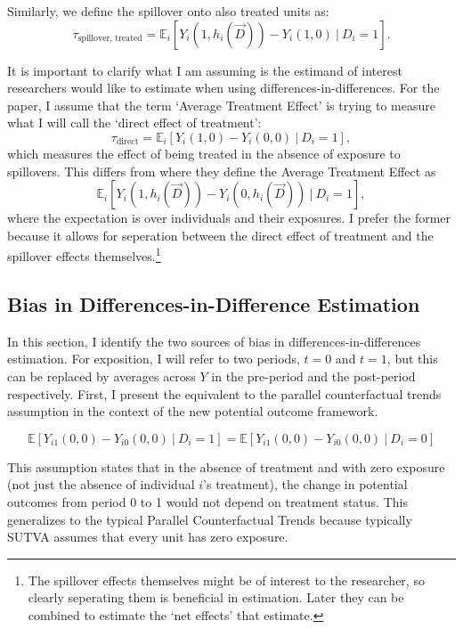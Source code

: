 \documentclass[11pt]{article}
\begin{document}
Similarly, we define the spillover onto also treated units as: \[ 
    \tau_{\text{spillover, treated}} = \mathbb{E}_i \left[ Y_{i}(1, h_i(\vec{D})) - Y_{i}(1, 0) \ \vert \ D_i = 1 \right].
\] 

It is important to clarify what I am assuming is the estimand of interest researchers would like to estimate when using differences-in-differences. For the paper, I assume that the term `Average Treatment Effect' is trying to measure what I will call the `direct effect of treatment': \[
    \tau_{\text{direct}} = \mathbb{E}_i \left[ Y_{i}(1, 0) - Y_{i}(0, 0) \ \vert \ D_i = 1 \right],
\] 
which measures the effect of being treated in the absence of exposure to spillovers. This differs from \citet{Sävje_Aronow_Hudgens_2019} where they define the Average Treatment Effect as \[ 
    \mathbb{E}_i \left[ Y_{i}(1, h_i(\vec{D})) - Y_{i}(0, h_i(\vec{D})) \ \vert \ D_i = 1 \right],
\] 
where the expectation is over individuals and their exposures. I prefer the former because it allows for seperation between the direct effect of treatment and the spillover effects themselves.\footnote{The spillover effects themselves might be of interest to the researcher, so clearly seperating them is beneficial in estimation. Later they can be combined to estimate the `net effects' that \citet{Sävje_Aronow_Hudgens_2019} estimate.}


\subsection{Bias in Differences-in-Difference Estimation}

In this section, I identify the two sources of bias in differences-in-differences estimation. For exposition, I will refer to two periods, $t = 0$ and $t = 1$, but this can be replaced by averages across $Y$ in the pre-period and the post-period respectively. First, I present the equivalent to the parallel counterfactual trends assumption in the context of the new potential outcome framework. 

\begin{assumption}\label{parallel}
    \[ 
        \mathbb{E}\left[ Y_{i1}(0, 0) - Y_{i0}(0, 0) \ \vert \ D_i = 1 \right] = 
        \mathbb{E}\left[ Y_{i1}(0, 0) - Y_{i0}(0, 0) \ \vert \ D_i = 0 \right]
    \]
\end{assumption}

This assumption states that in the absence of treatment and with zero exposure (not just the absence of individual $i$'s treatment), the change in potential outcomes from period 0 to 1 would not depend on treatment status. This generalizes to the typical Parallel Counterfactual Trends because typically SUTVA assumes that every unit has zero exposure.
\end{document}
